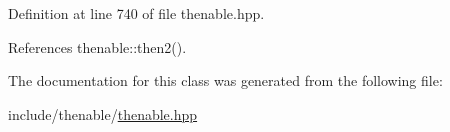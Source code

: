 Definition at line 740 of file thenable.\+hpp.



References thenable\+::then2().



The documentation for this class was generated from the following file\+:\begin{DoxyCompactItemize}
\item 
include/thenable/\hyperlink{thenable_8hpp}{thenable.\+hpp}\end{DoxyCompactItemize}
